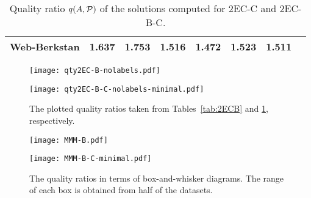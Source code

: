 \documentclass[11pt]{article}
\begin{document}
\begin{table}[!ht]
\begin{adjustbox}{width=\textwidth,totalheight=\textheight,keepaspectratio}
\begin{small}
\begin{tabular}{l|c|cccccc}
Web-Berkstan                        & 1.637                                               & 1.753                                                  & 1.516                                  & 1.472                                  & 1.523                                      & 1.511  \\
	\hline
\end{tabular}  \end{small}
\end{adjustbox}
\caption{Quality ratio $q(A,{\cal P})$ of the solutions computed for \textsf{2EC-C} and \textsf{2EC-B-C}.}\label{tab:2ECBC}
\end{table}



\begin{figure}[!ht]
\centering
\texttt{[image: qty2EC-B-nolabels.pdf]}

\vspace*{0.1in}

\texttt{[image: qty2EC-B-C-nolabels-minimal.pdf]}\caption{The plotted quality ratios taken from Tables~\ref{tab:2ECB} and \ref{tab:2ECBC}, respectively.
\label{fig:plottedquality}}
\end{figure}



\begin{figure}[!ht]
\centering
\texttt{[image: MMM-B.pdf]}

\vspace*{0.1in}

\texttt{[image: MMM-B-C-minimal.pdf]}\caption{The quality ratios in terms of box-and-whisker diagrams. The range of each box is obtained from half of the datasets.
\label{fig:box-quality}}
\end{figure}
\end{document}
